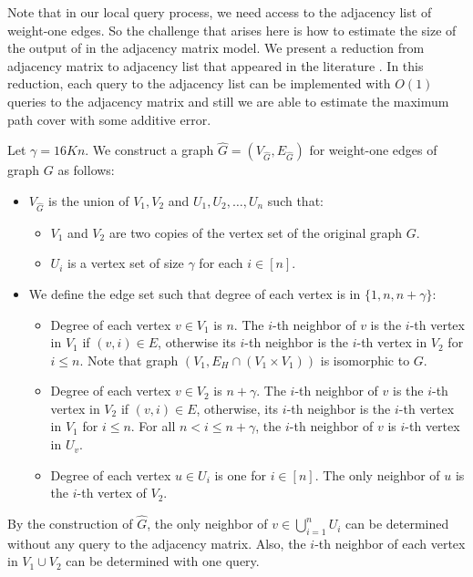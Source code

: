 \documentclass[letterpaper,11pt]{article}
\newcommand{\algtwo}[0]{\Cref{alg:path-cover22}}
\begin{document}
Note that in our local query process, we need access to the adjacency list of weight-one edges. So the challenge that arises here is how to estimate the size of the output of \algtwo{} in the adjacency matrix model. We present a reduction from adjacency matrix to adjacency list that appeared in the literature \cite{behnezhad2021}. In this reduction, each query to the adjacency list can be implemented with $O(1)$ queries to the adjacency matrix and still we are able to estimate the maximum path cover with some additive error.


Let $\gamma = 16Kn$. We construct a graph $\hat{G} = (V_{\hat{G}}, E_{\hat{G}})$ for weight-one edges of graph $G$ as follows:

\begin{itemize}
    \item $V_{\hat{G}}$ is the union of $V_1, V_2$ and $U_1, U_2, \ldots, U_n$ such that:
    \begin{itemize}
        \item $V_1$ and $V_2$ are two copies of the vertex set of the original graph $G$.
        \item $U_i$ is a vertex set of size $\gamma$ for each $i \in [n]$.
    \end{itemize}
    \item We define the edge set such that degree of each vertex is in $\{1, n, n + \gamma \}$:
    \begin{itemize}
        \item Degree of each vertex $v \in V_1$ is $n$. The $i$-th neighbor of $v$ is the $i$-th vertex in $V_1$ if $(v, i) \in E$, otherwise its $i$-th neighbor is the $i$-th vertex in $V_2$ for $i \leq n$. Note that graph $(V_1, E_H \cap (V_1 \times V_1))$ is isomorphic to $G$.
        \item Degree of each vertex $v \in V_2$ is $n + \gamma$. The $i$-th neighbor of $v$ is the $i$-th vertex in $V_2$ if $(v, i) \in E$, otherwise, its $i$-th neighbor is the $i$-th vertex in $V_1$ for $i \leq n$. For all $n < i \leq n + \gamma$, the $i$-th neighbor of $v$ is $i$-th vertex in $U_v$.
        \item Degree of each vertex $u \in U_i$ is one for $i \in [n]$. The only neighbor of $u$ is the $i$-th vertex of $V_2$.
    \end{itemize}
\end{itemize}

By the construction of $\hat{G}$, the only neighbor of $v \in \bigcup_{i=1}^n U_i$ can be determined without any query to the adjacency matrix. Also, the $i$-th neighbor of each vertex in $V_1 \cup V_2$ can be determined with one query.
\end{document}
